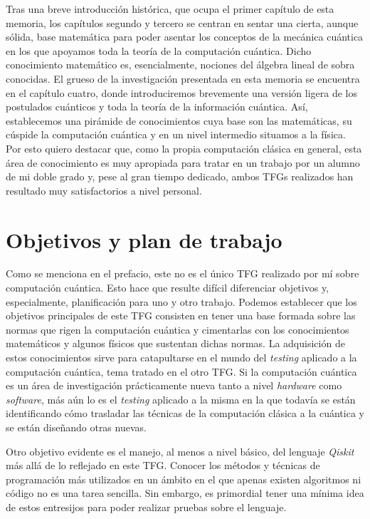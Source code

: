 Tras una breve introducción histórica, que ocupa el primer capítulo de esta memoria, los capítulos segundo y tercero se centran en sentar una cierta, aunque sólida, base matemática para poder asentar los conceptos de la mecánica cuántica en los que apoyamos toda la teoría de la computación cuántica. Dicho conocimiento matemático es, esencialmente, nociones del álgebra lineal de sobra conocidas. El grueso de la investigación presentada en esta memoria se encuentra en el capítulo cuatro, donde introduciremos brevemente una versión ligera de los postulados cuánticos y toda la teoría de la información cuántica.
%
Así, establecemos una pirámide de conocimientos cuya base son las matemáticas, su cúspide la computación cuántica y en un nivel intermedio situamos a la física. Por esto quiero destacar que, como la propia computación clásica en general, esta área de conocimiento es muy apropiada para tratar en un trabajo por un alumno de mi doble grado y, pese al gran tiempo dedicado, ambos TFGs realizados han resultado muy satisfactorios a nivel personal.

\chapter*{Objetivos y plan de trabajo}

Como se menciona en el prefacio, este no es el único TFG realizado por mí sobre computación cuántica. Esto hace que resulte difícil diferenciar objetivos y, especialmente, planificación para uno y otro trabajo.
%
Podemos establecer que los objetivos principales de este TFG consisten en tener una base formada sobre las normas que rigen la computación cuántica y cimentarlas con los conocimientos matemáticos y algunos físicos que sustentan dichas normas. La adquisición de estos conocimientos sirve para catapultarse en el mundo del \textit{testing} aplicado a la computación cuántica, tema tratado en el otro TFG. Si la computación cuántica es un área de investigación prácticamente nueva tanto a nivel \textit{hardware} como \textit{software}, más aún lo es el \textit{testing} aplicado a la misma en la que todavía se están identificando cómo trasladar las técnicas de la computación clásica a la cuántica y se están diseñando otras nuevas.

Otro objetivo evidente es el manejo, al menos a nivel básico, del lenguaje \textit{Qiskit} más allá de lo reflejado en este TFG. Conocer los métodos y técnicas de programación más utilizados en un ámbito en el que apenas existen algoritmos ni código no es una tarea sencilla. Sin embargo, es primordial tener una mínima idea de estos entresijos para poder realizar pruebas sobre el lenguaje.

